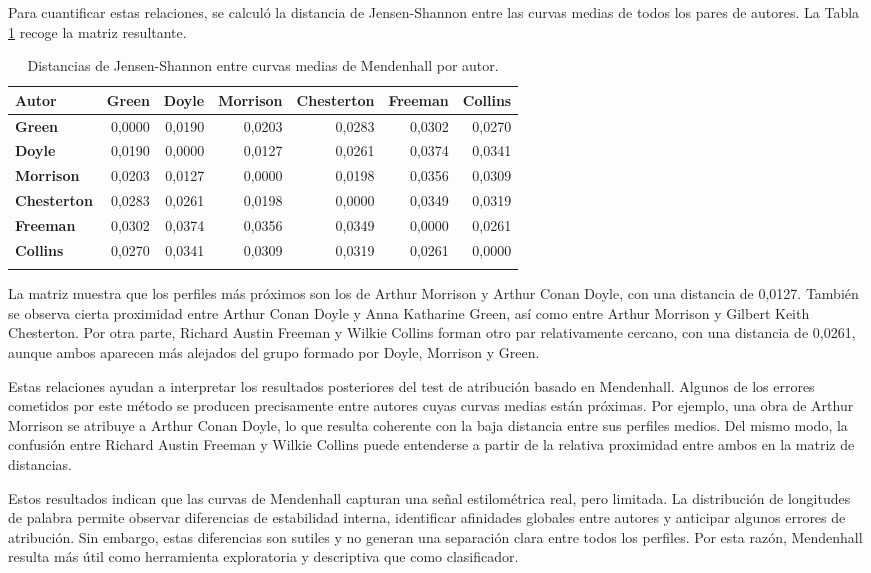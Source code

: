 \documentclass[IB]{TFUOC}%
\begin{document}
Para cuantificar estas relaciones, se calculó la distancia de Jensen-Shannon entre las curvas medias de todos los pares de autores. La Tabla \ref{tab:mendenhall-distancias-autores} recoge la matriz resultante.

\begin{longtable}{|p{3cm}|r|r|r|r|r|r|}
\hline
\textbf{Autor} & \textbf{Green} & \textbf{Doyle} & \textbf{Morrison} & \textbf{Chesterton} & \textbf{Freeman} & \textbf{Collins} \\
\hline
\textbf{Green} & 0,0000 & 0,0190 & 0,0203 & 0,0283 & 0,0302 & 0,0270 \\
\hline
\textbf{Doyle} & 0,0190 & 0,0000 & 0,0127 & 0,0261 & 0,0374 & 0,0341 \\
\hline
\textbf{Morrison} & 0,0203 & 0,0127 & 0,0000 & 0,0198 & 0,0356 & 0,0309 \\
\hline
\textbf{Chesterton} & 0,0283 & 0,0261 & 0,0198 & 0,0000 & 0,0349 & 0,0319 \\
\hline
\textbf{Freeman} & 0,0302 & 0,0374 & 0,0356 & 0,0349 & 0,0000 & 0,0261 \\
\hline
\textbf{Collins} & 0,0270 & 0,0341 & 0,0309 & 0,0319 & 0,0261 & 0,0000 \\
\hline
\caption{Distancias de Jensen-Shannon entre curvas medias de Mendenhall por autor.}
\label{tab:mendenhall-distancias-autores}
\end{longtable}

La matriz muestra que los perfiles más próximos son los de Arthur Morrison y Arthur Conan Doyle, con una distancia de 0,0127. También se observa cierta proximidad entre Arthur Conan Doyle y Anna Katharine Green, así como entre Arthur Morrison y Gilbert Keith Chesterton. Por otra parte, Richard Austin Freeman y Wilkie Collins forman otro par relativamente cercano, con una distancia de 0,0261, aunque ambos aparecen más alejados del grupo formado por Doyle, Morrison y Green.

Estas relaciones ayudan a interpretar los resultados posteriores del test de atribución basado en Mendenhall. Algunos de los errores cometidos por este método se producen precisamente entre autores cuyas curvas medias están próximas. Por ejemplo, una obra de Arthur Morrison se atribuye a Arthur Conan Doyle, lo que resulta coherente con la baja distancia entre sus perfiles medios. Del mismo modo, la confusión entre Richard Austin Freeman y Wilkie Collins puede entenderse a partir de la relativa proximidad entre ambos en la matriz de distancias.

Estos resultados indican que las curvas de Mendenhall capturan una señal estilométrica real, pero limitada. La distribución de longitudes de palabra permite observar diferencias de estabilidad interna, identificar afinidades globales entre autores y anticipar algunos errores de atribución. Sin embargo, estas diferencias son sutiles y no generan una separación clara entre todos los perfiles. Por esta razón, Mendenhall resulta más útil como herramienta exploratoria y descriptiva que como clasificador.
\end{document}
